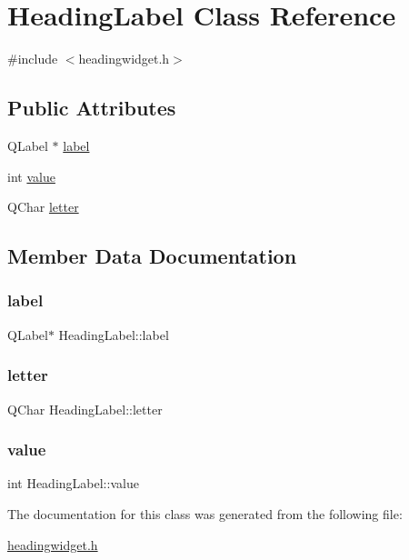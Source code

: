 \hypertarget{class_heading_label}{}\section{Heading\+Label Class Reference}
\label{class_heading_label}


{\ttfamily \#include $<$headingwidget.\+h$>$}

\subsection*{Public Attributes}
\begin{DoxyCompactItemize}
\item 
Q\+Label $\ast$ \mbox{\hyperlink{class_heading_label_afccf58edf41d4f0348bfcf516cb6fd3e}{label}}
\item 
int \mbox{\hyperlink{class_heading_label_a3a143c7f61d71bf184a3f9213235c683}{value}}
\item 
Q\+Char \mbox{\hyperlink{class_heading_label_a4091a6954e53d4440c2d30b13fee42d7}{letter}}
\end{DoxyCompactItemize}


\subsection{Member Data Documentation}
\mbox{\label{class_heading_label_afccf58edf41d4f0348bfcf516cb6fd3e}} 
\subsubsection{\texorpdfstring{label}{label}}
{\footnotesize\ttfamily Q\+Label$\ast$ Heading\+Label\+::label}

\mbox{\label{class_heading_label_a4091a6954e53d4440c2d30b13fee42d7}} 
\subsubsection{\texorpdfstring{letter}{letter}}
{\footnotesize\ttfamily Q\+Char Heading\+Label\+::letter}

\mbox{\label{class_heading_label_a3a143c7f61d71bf184a3f9213235c683}} 
\subsubsection{\texorpdfstring{value}{value}}
{\footnotesize\ttfamily int Heading\+Label\+::value}



The documentation for this class was generated from the following file\+:\begin{DoxyCompactItemize}
\item 
\mbox{\hyperlink{headingwidget_8h}{headingwidget.\+h}}\end{DoxyCompactItemize}

